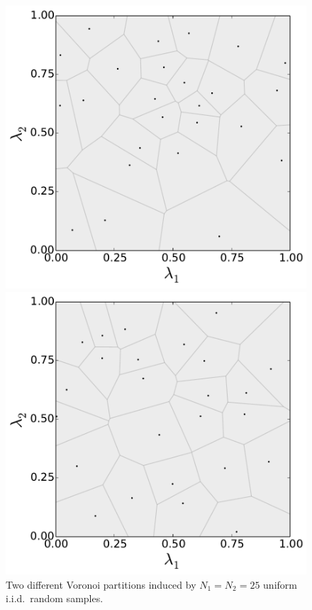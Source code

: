 \begin{figure}[h]
\centering
	\begin{minipage}{.4875\textwidth}
		\includegraphics[width=\linewidth]{./images/voronoi_diagram_N25_r0}
	\end{minipage}
		\begin{minipage}{.4875\textwidth}
		\includegraphics[width=\linewidth]{./images/voronoi_diagram_N25_r10}
	\end{minipage}
\caption{
Two different Voronoi partitions induced by $N_1 = N_2 = 25 $ uniform i.i.d.~random samples. 
}
\label{fig:voronoi_issues}
\end{figure}


